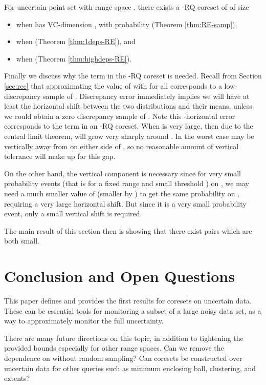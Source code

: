 \documentclass[11pt]{myclass}
\newcommand{\RQ}{\textsf{RQ}\xspace}
\newcommand{\denselist}{\vspace{-.1in} \itemsep -2pt\parsep=-1pt\partopsep -2pt}
\begin{document}
\begin{corollary}
For uncertain point set  with range space , there exists a -RQ coreset of  of size 
\begin{itemize} \denselist
\item  when  has VC-dimension , with probability  (Theorem \ref{thm:RE-samp}),
\item  when  (Theorem \ref{thm:1deps-RE}), and
\item  when  (Theorem \ref{thm:highdeps-RE}).
\end{itemize}
\end{corollary}


Finally we discuss why the  term in the -\RQ coreset  is needed.  
Recall from Section \ref{sec:rec} that approximating the value of   with  for all  corresponds to a low-discrepancy sample of . Discrepancy error immediately implies we will have at least the  horizontal shift between the two distributions and their means, unless we could obtain a zero discrepancy sample of .  Note this -horizontal error corresponds to the  term in an -\RQ coreset.  
When  is very large, then due to the central limit theorem,  will grow very sharply around .  
In the worst case  may be  vertically away from  on either side of , so no reasonable amount of  vertical tolerance will make up for this gap.  

On the other hand, the  vertical component is necessary since for very small probability events (that is for a fixed range  and small threshold ) on , we may need a much smaller value of  (smaller by ) to get the same probability on , requiring a very large horizontal shift.  But since it is a very small probability event, only a small vertical  shift is required.  

The main result of this section then is showing that there exist pairs  which are both small.  



\section{Conclusion and Open Questions}
This paper defines and provides the first results for coresets on uncertain data.  These can be essential tools for monitoring a subset of a large noisy data set, as a way to approximately monitor the full uncertainty.  

There are many future directions on this topic, in addition to tightening the provided bounds especially for other range spaces.  Can we remove the dependence on  without random sampling?   Can coresets be constructed over uncertain data for other queries such as minimum enclosing ball, clustering, and extents?  
\end{document}
